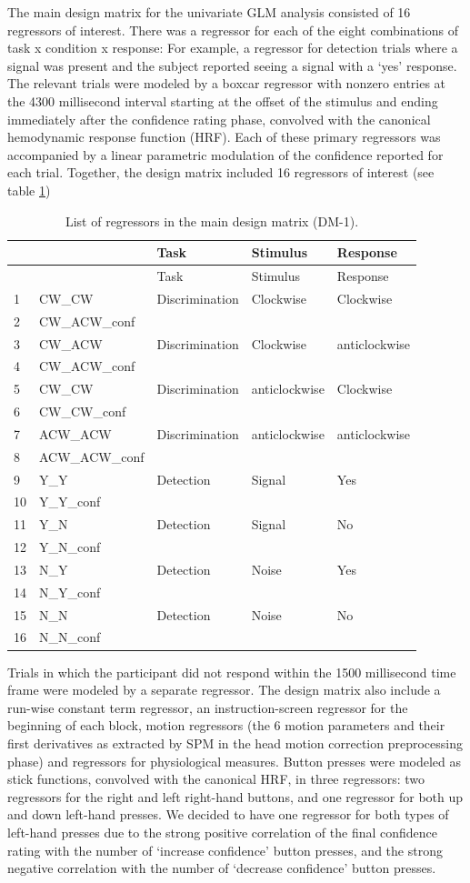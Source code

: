 \documentclass[12pt,twoside]{reedthesis}
\begin{document}
The main design matrix for the univariate GLM analysis consisted of 16 regressors of interest. There was a regressor for each of the eight combinations of task x condition x response: For example, a regressor for detection trials where a signal was present and the subject reported seeing a signal with a `yes' response. The relevant trials were modeled by a boxcar regressor with nonzero entries at the 4300 millisecond interval starting at the offset of the stimulus and ending immediately after the confidence rating phase, convolved with the canonical hemodynamic response function (HRF).
Each of these primary regressors was accompanied by a linear parametric modulation of the confidence reported for each trial. Together, the design matrix included 16 regressors of interest (see table \ref{tab:fMRIDM1})
\begin{longtable}[]{@{}lllll@{}}
\caption{\label{tab:fMRIDM1} List of regressors in the main design matrix (DM-1).}\tabularnewline
\toprule
& & Task & Stimulus & Response\tabularnewline
\midrule
\endfirsthead
\toprule
& & Task & Stimulus & Response\tabularnewline
\midrule
\endhead
1 & CW\_CW & Discrimination & Clockwise & Clockwise\tabularnewline
2 & CW\_ACW\_conf & & &\tabularnewline
3 & CW\_ACW & Discrimination & Clockwise & anticlockwise\tabularnewline
4 & CW\_ACW\_conf & & &\tabularnewline
5 & CW\_CW & Discrimination & anticlockwise & Clockwise\tabularnewline
6 & CW\_CW\_conf & & &\tabularnewline
7 & ACW\_ACW & Discrimination & anticlockwise & anticlockwise\tabularnewline
8 & ACW\_ACW\_conf & & &\tabularnewline
9 & Y\_Y & Detection & Signal & Yes\tabularnewline
10 & Y\_Y\_conf & & &\tabularnewline
11 & Y\_N & Detection & Signal & No\tabularnewline
12 & Y\_N\_conf & & &\tabularnewline
13 & N\_Y & Detection & Noise & Yes\tabularnewline
14 & N\_Y\_conf & & &\tabularnewline
15 & N\_N & Detection & Noise & No\tabularnewline
16 & N\_N\_conf & & &\tabularnewline
\bottomrule
\end{longtable}
Trials in which the participant did not respond within the 1500 millisecond time frame were modeled by a separate regressor. The design matrix also include a run-wise constant term regressor, an instruction-screen regressor for the beginning of each block, motion regressors (the 6 motion parameters and their first derivatives as extracted by SPM in the head motion correction preprocessing phase) and regressors for physiological measures. Button presses were modeled as stick functions, convolved with the canonical HRF, in three regressors: two regressors for the right and left right-hand buttons, and one regressor for both up and down left-hand presses. We decided to have one regressor for both types of left-hand presses due to the strong positive correlation of the final confidence rating with the number of `increase confidence' button presses, and the strong negative correlation with the number of `decrease confidence' button presses.
\end{document}
